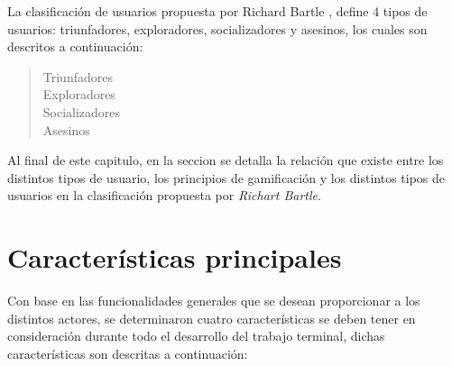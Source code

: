     La clasificación de usuarios propuesta por Richard Bartle \cite{TiposDeUsuario}, define
    4 tipos de usuarios: triunfadores, exploradores, socializadores y asesinos, los cuales son
    descritos a continuación:
    
        \begin{quote}
        \begin{description}
        \item[Triunfadores]

        \item[Exploradores] 

        \item[Socializadores]

        \item[Asesinos]
        \end{description}
        \end{quote}

    \noindent 
    Al final de este capitulo, en la seccion  se detalla
    la relación que existe entre los distintos tipos de usuario, los principios de
    gamificación y los distintos tipos de usuarios en la clasificación propuesta por
    {\it Richart Bartle}.


\section{Características principales}

 Con base en las funcionalidades generales que se desean proporcionar a los distintos
 actores, se determinaron cuatro características se deben tener en consideración durante
 todo el desarrollo del trabajo terminal, dichas características son descritas a continuación:


